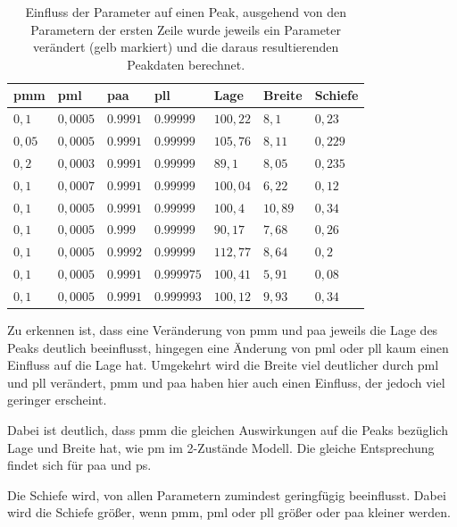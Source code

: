 \begin{table}[h]
\centering
\caption[Einfluss auf einen Peak (2)]{Einfluss der Parameter auf einen Peak, ausgehend von den Parametern der ersten Zeile wurde jeweils ein Parameter verändert (gelb markiert) und die daraus resultierenden Peakdaten berechnet.}
\label{einfluss_t100}
\begin{tabular}{|l|l|l|l||l|l|l|}
\hline
pmm & pml    & paa    & pll      & Lage  & Breite & Schiefe \\ \hline \hline
 $0,1$ & $0,0005$  & $0.9991$  & $0.99999$  & $100,22$  & $8,1$  & $0,23$ \\ \hline
\cellcolor{yellow} $0,05$ & $0,0005$  & $0.9991$  & $0.99999$  & $105,76$  & $8,11$  & $0,229$ \\ \hline
\cellcolor{yellow} $0,2$ & $0,0003$  & $0.9991$  & $0.99999$  & $89,1$  & $8,05$  & $0,235$ \\ \hline
 $0,1$ & \cellcolor{yellow} $0,0007$  & $0.9991$  & $0.99999$  & $100,04$  & $6,22$  & $0,12$ \\ \hline
 $0,1$ & \cellcolor{yellow} $0,0005$  & $0.9991$  & $0.99999$  & $100,4$  & $10,89$  & $0,34$ \\ \hline
 $0,1$ & $0,0005$  & \cellcolor{yellow} $0.999$  & $0.99999$  & $90,17$  & $7,68$  & $0,26$ \\ \hline
 $0,1$ & $0,0005$  & \cellcolor{yellow} $0.9992$  & $0.99999$  & $112,77$  & $8,64$  & $0,2$ \\ \hline
 $0,1$ & $0,0005$  & $0.9991$  & \cellcolor{yellow} $0.999975$  & $100,41$  & $5,91$  & $0,08$ \\ \hline
 $0,1$ & $0,0005$  & $0.9991$  & \cellcolor{yellow} $0.999993$  & $100,12$  & $9,93$  & $0,34$ \\ \hline
\end{tabular}
\end{table}

Zu erkennen ist, dass eine Veränderung von pmm und paa jeweils die Lage des Peaks deutlich beeinflusst, hingegen eine Änderung von pml oder pll kaum einen Einfluss auf die Lage hat. Umgekehrt wird die Breite viel deutlicher durch pml und pll verändert, pmm und paa haben hier auch einen Einfluss, der jedoch viel geringer erscheint. 

Dabei ist deutlich, dass pmm die gleichen Auswirkungen auf die Peaks bezüglich Lage und Breite hat, wie pm im 2-Zustände Modell. Die gleiche Entsprechung findet sich für paa und ps.

Die Schiefe wird, von allen Parametern zumindest geringfügig beeinflusst. Dabei wird die Schiefe größer, wenn pmm, pml oder pll größer oder paa kleiner werden.
 
